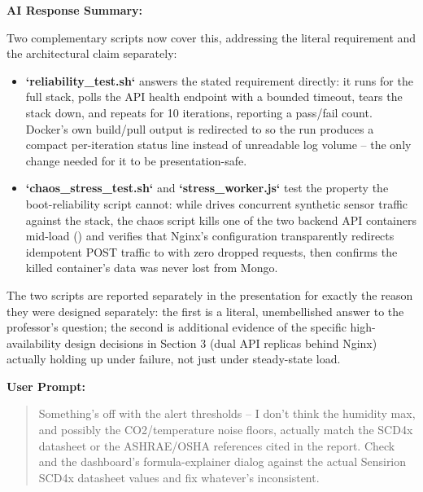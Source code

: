 \documentclass[conference]{IEEEtran}
\begin{document}
\noindent\textbf{AI Response Summary:}\par

Two complementary scripts now cover this, addressing the literal requirement and the architectural claim separately:

\begin{itemize}
\setlength{\itemsep}{2pt}
\item \textbf{`reliability\_test.sh`} answers the stated requirement directly: it runs \texttt{} for the full stack, polls the API health endpoint with a bounded timeout, tears the stack down, and repeats for 10 iterations, reporting a pass/fail count. Docker's own build/pull output is redirected to \texttt{} so the run produces a compact per-iteration status line instead of unreadable log volume -- the only change needed for it to be presentation-safe.
\item \textbf{`chaos\_stress\_test.sh`} and \textbf{`stress\_worker.js`} test the property the boot-reliability script cannot: while \texttt{} drives concurrent synthetic sensor traffic against the stack, the chaos script kills one of the two backend API containers mid-load (\texttt{}) and verifies that Nginx's \texttt{} configuration transparently redirects idempotent POST traffic to \texttt{} with zero dropped requests, then confirms the killed container's data was never lost from Mongo.
\end{itemize}

The two scripts are reported separately in the presentation for exactly the reason they were designed separately: the first is a literal, unembellished answer to the professor's question; the second is additional evidence of the specific high-availability design decisions in Section 3 (dual API replicas behind Nginx) actually holding up under failure, not just under steady-state load.

\par\vspace{4pt}\par\vspace{2pt}

\noindent\textbf{User Prompt:}\par

\begin{quote}
Something's off with the alert thresholds -- I don't think the humidity max, and possibly the CO2/temperature noise floors, actually match the SCD4x datasheet or the ASHRAE/OSHA references cited in the report. Check \texttt{} and the dashboard's formula-explainer dialog against the actual Sensirion SCD4x datasheet values and fix whatever's inconsistent.
\end{quote}
\end{document}

